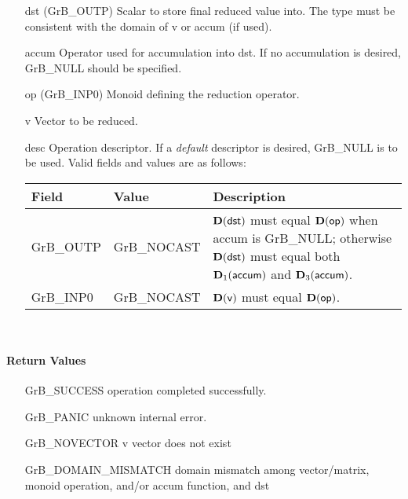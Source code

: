 \begin{itemize}[leftmargin=1.1in]
    \item[{\sf dst}]    ({\sf GrB\_OUTP}) Scalar to store final reduced value into.  The type must be
                        consistent with the domain of {\sf v} or {\sf accum} (if used).

    \item[{\sf accum}]  Operator used for accumulation into {\sf dst}.  If no accumulation
                        is desired, {\sf GrB\_NULL} should be specified.

    \item[{\sf op}]     ({\sf GrB\_INP0}) Monoid defining the reduction operator.
    \item[{\sf v}]    Vector to be reduced.

    \item[{\sf desc}]   Operation descriptor. If a
    \emph{default} descriptor is desired, {\sf GrB\_NULL} is to be
    used.  Valid fields and values are as follows: \\
    \begin{tabular}{llp{3in}}
    Field  & Value & Description \\
    \hline
    {\sf GrB\_OUTP} & {\sf GrB\_NOCAST} & $\bold{D}({\sf dst})$ must equal $\bold{D}({\sf op})$ when
                                          {\sf accum} is {\sf GrB\_NULL}; otherwise $\bold{D}({\sf dst})$
                                          must equal both $\bold{D}_1({\sf accum})$ and $\bold{D}_3({\sf accum})$. \\
    {\sf GrB\_INP0} & {\sf GrB\_NOCAST} & $\bold{D}({\sf v})$ must equal $\bold{D}({\sf op})$.\\
    \end{tabular}\\
\end{itemize}

\paragraph{Return Values}

\begin{itemize}[leftmargin=2.1in]
\item[{\sf GrB\_SUCCESS}]             operation completed successfully.
\item[{\sf GrB\_PANIC}]               unknown internal error.
\item[{\sf GrB\_NOVECTOR}]   {\sf v} vector does not exist
\item[{\sf GrB\_DOMAIN\_MISMATCH}]  
        domain mismatch among vector/matrix, monoid operation, and/or
        accum function, and {\sf dst} 
\end{itemize}

